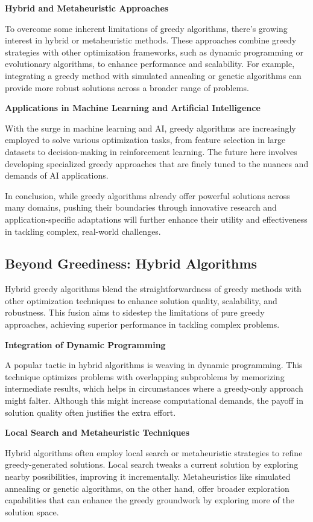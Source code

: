 \documentclass[12pt]{book} %
\begin{document}
\textbf{Hybrid and Metaheuristic Approaches}

To overcome some inherent limitations of greedy algorithms, there’s growing interest in hybrid or metaheuristic methods. These approaches combine greedy strategies with other optimization frameworks, such as dynamic programming or evolutionary algorithms, to enhance performance and scalability. For example, integrating a greedy method with simulated annealing or genetic algorithms can provide more robust solutions across a broader range of problems.

\textbf{Applications in Machine Learning and Artificial Intelligence}

With the surge in machine learning and AI, greedy algorithms are increasingly employed to solve various optimization tasks, from feature selection in large datasets to decision-making in reinforcement learning. The future here involves developing specialized greedy approaches that are finely tuned to the nuances and demands of AI applications.

In conclusion, while greedy algorithms already offer powerful solutions across many domains, pushing their boundaries through innovative research and application-specific adaptations will further enhance their utility and effectiveness in tackling complex, real-world challenges.

\subsection{Beyond Greediness: Hybrid Algorithms}

Hybrid greedy algorithms blend the straightforwardness of greedy methods with other optimization techniques to enhance solution quality, scalability, and robustness. This fusion aims to sidestep the limitations of pure greedy approaches, achieving superior performance in tackling complex problems.

\textbf{Integration of Dynamic Programming}

A popular tactic in hybrid algorithms is weaving in dynamic programming. This technique optimizes problems with overlapping subproblems by memorizing intermediate results, which helps in circumstances where a greedy-only approach might falter. Although this might increase computational demands, the payoff in solution quality often justifies the extra effort.

\textbf{Local Search and Metaheuristic Techniques}

Hybrid algorithms often employ local search or metaheuristic strategies to refine greedy-generated solutions. Local search tweaks a current solution by exploring nearby possibilities, improving it incrementally. Metaheuristics like simulated annealing or genetic algorithms, on the other hand, offer broader exploration capabilities that can enhance the greedy groundwork by exploring more of the solution space.
\end{document}
